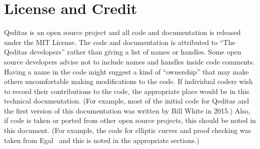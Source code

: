\section{License and Credit}

Qeditas is an open source project and all code and documentation is released
under the MIT License. The code and documentation is attributed to
``The Qeditas developers'' rather than giving a list of names or handles.
Some open source developers advise not to include names and handles inside
code comments. Having a name in the code might suggest a kind of ``ownership''
that may make others uncomfortable making modifications to the code.
If individual coders wish to record their contributions to the
code, the appropriate place would be in this technical documentation.
(For example, most of the initial code for Qeditas and the
first version of this documentation was written
by Bill White in 2015.)
Also, if code is taken or ported from other open source projects, this
should be noted in this document.
(For example, the code for elliptic curves and proof checking was taken from Egal~\cite{Brown2014}
and this is noted in the appropriate sections.)
